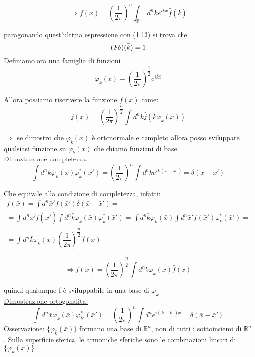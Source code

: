 \documentclass[a4paper,11pt]{report}
\newcommand{\Rn}{\mathbb{R}^n}
\newcommand{\fourier}{\emph{F}}
\newcommand{\x}{\bar{x}}
\newcommand{\xp}{\bar{x}'}
\newcommand{\kk}{\bar{k}}
\newcommand{\kp}{\bar{k}'}
\begin{document}
\begin{equation}
\Rightarrow f(\bar{x})=\left(\dfrac{1}{2\pi}\right)^n\int_{\Rn}d^n\bar{k}e^{i\bar{k}\bar{x}}\hat{f}(\bar{k})
\end{equation}

paragonando quest'ultima espressione con (1.13) si trova che
\begin{equation}
(\fourier\delta)(\kk)=1
\end{equation}
Definiamo ora una famiglia di funzioni
\begin{equation}
\varphi_{\kk}(\x)=\left(\dfrac{1}{2\pi}\right)^{\dfrac{1}{2}}e^{i\kk\x}
\end{equation}

Allora possiamo riscrivere la funzione $f(\x)$ come:
$$
f(\x)=\left(\dfrac{1}{2\pi}\right)^{\dfrac{n}{2}}\int d^n\kk\hat{f}(\kk\varphi_{\kk}(\x))
$$

$\Rightarrow$ se dimostro che $\varphi_{\bar{k}}(\bar{x})$ è \underline{ortonormale} e \underline{completo} allora posso sviluppare qualsiasi funzione su $\varphi_{\kk}(\x)$ che chiamo \underline{funzioni di base}.\\
\underline{Dimostrazione completezza:}
\begin{equation}
\int d^n\kk \varphi_{\kk}(\x)\varphi_{\kk}^{*}(\xp)=\left(\dfrac{1}{2\pi}\right)^n\int d^n\kk e^{i\kk(\x-\xp)}=\delta(\x-\xp)
\end{equation}

Che equivale alla condizione di completezza, infatti:
\begin{multline*}
f(\x)=\int d^n\xp f(\xp)\delta(\x-\xp)=\\
=\int d^n\bar{x'}f(\bar{x'})\int d^n\kk\varphi_{\kk}(\x)\varphi_{\kk}^{*}(\xp)=\int d^n\kk\varphi_{\kk}(\x)\int d^n\xp f(\xp)\varphi_{\kk}^{*}(\xp)=\\
=\int d^n\kk\varphi_{\kk}(\x)\left(\dfrac{1}{2\pi}\right)^{\dfrac{n}{2}}\hat{f}(\x)
\end{multline*}


$$
\Rightarrow f(\bar{x})=\left(\dfrac{1}{2\pi}\right)^{\dfrac{n}{2}}\int d^n\bar{k}\varphi_{\bar{k}}(\bar{x})\hat{f}(\bar{x})
$$

quindi qualunque f è sviluppabile in una base di $\varphi_{\bar{k}}$\\
\underline{Dimostrazione ortogonalita:}\\
\begin{equation}
\int d^n\x\varphi_{k}(\x)\varphi_{\kp}^{*}(\xp)=\left(\dfrac{1}{2\pi}\right)^{n}\int d^n e^{i(\kk-\kp)\x}=\delta (\x-\xp)
\end{equation}
\underline{Osservazione:} $\{\varphi_{\bar{k}}(\bar{x})\}$ formano una \underline{base} di $\Rn$, non di tutti i sottoinsiemi di $\Rn$. Sulla superficie sferica, le armoniche sferiche sono le combinazioni lineari di $\{\varphi_{\kk}(\x)\}$
\end{document}
